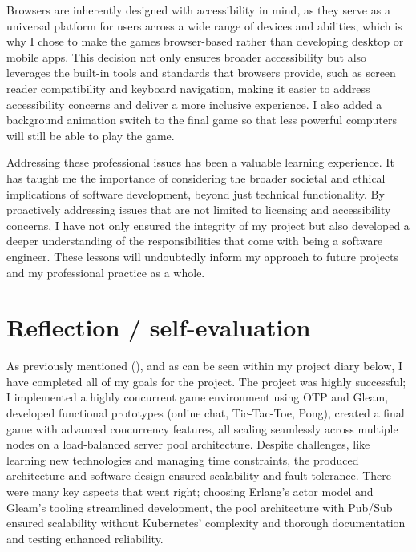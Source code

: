 \documentclass[]{final}
\begin{document}
Browsers are inherently designed with accessibility in mind, as they serve
as a universal platform for users across a wide range of devices and
abilities, which is why I chose to make the games browser-based rather than
developing desktop or mobile apps. This decision not only ensures broader
accessibility but also leverages the built-in tools and standards that
browsers provide, such as screen reader compatibility and keyboard navigation,
making it easier to address accessibility concerns and deliver a more
inclusive experience. I also added a background animation switch to the final
game so that less powerful computers will still be able to play the game.

Addressing these professional issues has been a valuable learning experience.
It has taught me the importance of considering the broader societal and
ethical implications of software development, beyond just technical
functionality. By proactively addressing issues that are not limited to
licensing and accessibility concerns, I have not only ensured the integrity of my
project but also developed a deeper understanding of the responsibilities
that come with being a software engineer. These lessons will
undoubtedly inform my approach to future projects and my professional
practice as a whole.

\chapter{Reflection / self-evaluation}

As previously mentioned {\hypersetup{linkcolor=teal}(\pageref{valkeyMessageBroker})}, and as can be seen within my project diary below,
I have completed all of my goals for the project.
The project was highly successful; I implemented a highly concurrent game environment
using OTP and Gleam, developed functional prototypes (online chat, Tic-Tac-Toe,
Pong), created a final game with advanced concurrency features, all scaling
seamlessly across multiple nodes on a load-balanced server pool architecture.
Despite challenges, like learning new technologies and managing time
constraints, the produced architecture and software design ensured
scalability and fault tolerance.
There were many key aspects that went right; choosing Erlang’s actor model
and Gleam’s tooling streamlined development,
the pool architecture with Pub/Sub ensured scalability without Kubernetes’
complexity and thorough documentation and testing enhanced reliability.
\end{document}
